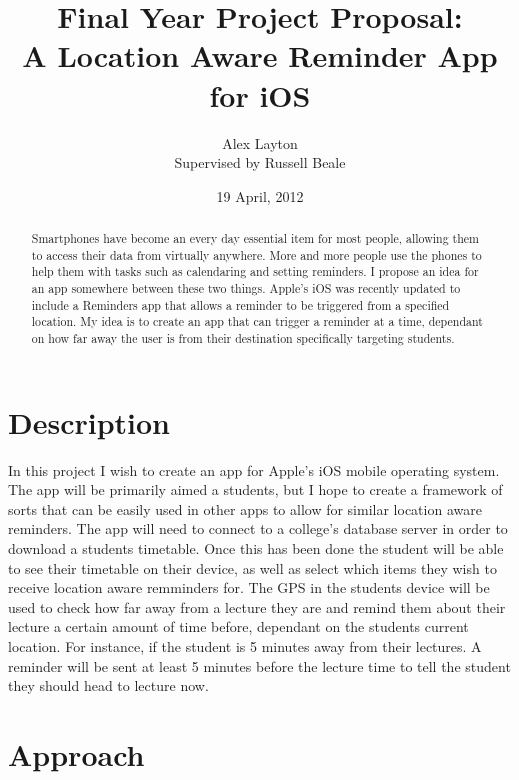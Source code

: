 \documentclass[11pt]{article}
\title{{\small Final Year Project Proposal:} \\ A Location Aware Reminder App for iOS}
\author{Alex Layton \\ {\small Supervised by Russell Beale}}
\date{19 April, 2012}
\begin{document}
\maketitle

\begin{abstract}
	Smartphones have become an every day essential item for most people, allowing them to access their data from virtually anywhere. More and more people use the phones to help them with tasks such as calendaring and setting reminders. I propose an idea for an app somewhere between these two things. Apple's iOS was recently updated to include a Reminders app that allows a reminder to be triggered from a specified location. My idea is to create an app that can trigger a reminder at a time, dependant on how far away the user is from their destination specifically targeting students.   
\end{abstract}

\section*{Description}
	In this project I wish to create an app for Apple's iOS mobile operating system. The app will be primarily aimed a students, but I hope to create a framework of sorts that can be easily used in other apps to allow for similar location aware reminders.
	The app will need to connect to a college's database server in order to download a students timetable. Once this has been done the student will be able to see their timetable on their device, as well as select which items they wish to receive location aware remminders for. The GPS in the students device will be used to check how far away from a lecture they are and remind them about their lecture a certain amount of time before, dependant on the students current location. For instance, if the student is 5 minutes away from their lectures. A reminder will be sent at least 5 minutes before the lecture time to tell the student they should head to lecture now.

\section*{Approach}
\end{document}
